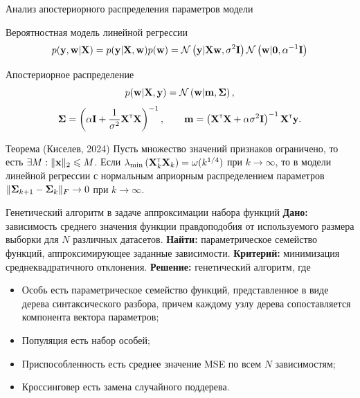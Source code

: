 \documentclass[10pt]{beamer}
\begin{document}
\begin{frame}{Анализ апостериорного распределения параметров модели}
    \begin{block}{Вероятностная модель линейной регрессии}
        \[ p(\mathbf{y}, \mathbf{w} | \mathbf{X}) = p(\mathbf{y} | \mathbf{X}, \mathbf{w}) p(\mathbf{w}) = \mathcal{N}\left( \mathbf{y} | \mathbf{X} \mathbf{w}, \sigma^2 \mathbf{I} \right) \mathcal{N}\left( \mathbf{w} | \mathbf{0}, \alpha^{-1} \mathbf{I} \right) \]
    \end{block}
    \vfill
    \begin{block}{Апостериорное распределение}
        \[ p(\mathbf{w} | \mathbf{X}, \mathbf{y}) = \mathcal{N}\left( \mathbf{w} | \mathbf{m}, \boldsymbol{\Sigma} \right), \]
        \[ \boldsymbol{\Sigma} = \left( \alpha \mathbf{I} + \dfrac{1}{\sigma^2} \mathbf{X}^{\text{\tiny\sffamily\upshape\mdseries T}} \mathbf{X} \right)^{-1}, \qquad \mathbf{m} = \left( \mathbf{X}^{\text{\tiny\sffamily\upshape\mdseries T}} \mathbf{X} + \alpha \sigma^2 \mathbf{I} \right)^{-1} \mathbf{X}^{\text{\tiny\sffamily\upshape\mdseries T}} \mathbf{y}. \]
    \end{block}
    \vfill
    \begin{block}{Теорема (Киселев, 2024)}
        Пусть множество значений признаков ограничено, то есть $\exists M: \| \mathbf{x} \|_2 \leqslant M$. Если  $\lambda_{\min}\left( \mathbf{X}^{\text{\tiny\sffamily\upshape\mdseries T}}_k \mathbf{X}_k \right) = \omega(k^{1/4})$ при $k \to \infty$, то в модели линейной регрессии с нормальным априорным распределением параметров $\| \boldsymbol{\Sigma}_{k+1} - \boldsymbol{\Sigma}_k \|_{F} \to 0$ при $k \to \infty$.
    \end{block}
\end{frame}
\begin{frame}{Генетический алгоритм в задаче аппроксимации набора функций}
    \textbf{Дано:} зависимость среднего значения функции правдоподобия от используемого размера выборки для $N$ различных датасетов.
    \vfill
    \textbf{Найти:} параметрическое семейство функций, аппроксимирующее заданные зависимости.
    \vfill
    \textbf{Критерий:} минимизация среднеквадратичного отклонения.
    \vfill
    \textbf{Решение:} генетический алгоритм, где
    \begin{itemize}
        \item Особь есть параметрическое семейство функций, представленное в виде дерева синтаксического разбора, причем каждому узлу дерева сопоставляется компонента вектора параметров;
        \item Популяция есть набор особей;
        \item Приспособленность есть среднее значение MSE по всем $N$ зависимостям;
        \item Кроссинговер есть замена случайного поддерева.
    \end{itemize}
\end{frame}
\end{document}
